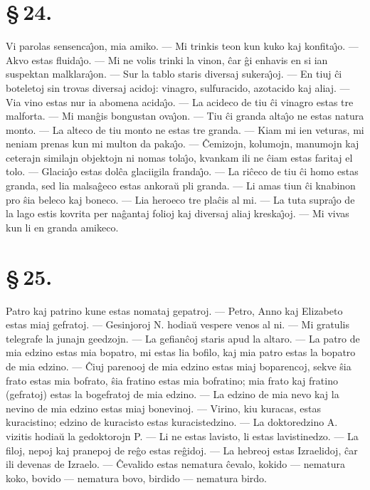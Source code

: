 \section*{\S\,24.}
Vi parolas sensenca\^{\j}on, mia amiko. --- Mi trinkis teon kun kuko
kaj konfita\^{\j}o. --- Akvo estas fluida\^{\j}o. --- Mi ne volis
trinki la vinon, \^car \^gi enhavis en si ian suspektan
malklara\^{\j}on. --- Sur la tablo staris diversaj sukera\^{\j}oj.
--- En tiuj \^ci boteletoj sin trovas diversaj acidoj: vinagro,
sulfuracido, azotacido kaj aliaj. --- Via vino estas nur ia abomena
acida\^{\j}o. --- La acideco de tiu \^ci vinagro estas tre malforta.
--- Mi man\^gis bongustan ova\^{\j}on. --- Tiu \^ci granda alta\^{\j}o
ne estas natura monto. --- La alteco de tiu monto ne estas tre
granda. --- Kiam mi ien veturas, mi neniam prenas kun mi multon da
paka\^{\j}o. --- \^Cemizojn, kolumojn, manumojn kaj ceterajn
similajn objektojn ni nomas tola\^{\j}o, kvankam ili ne \^ciam estas
faritaj el tolo. --- Glacia\^{\j}o estas dol\^ca glaciigila
franda\^{\j}o. --- La ri\^ceco de tiu \^ci homo estas granda, sed
lia malsa\^geco estas ankora\u u pli granda. --- Li amas tiun \^ci
knabinon pro \^sia beleco kaj boneco. --- Lia heroeco tre pla\^cis
al mi. --- La tuta supra\^{\j}o de la lago estis kovrita per
na\^gantaj folioj kaj diversaj aliaj kreska\^{\j}oj. --- Mi vivas
kun li en granda amikeco.


\section*{\S\,25.}
Patro kaj patrino kune estas nomataj gepatroj. --- Petro, Anno kaj
Elizabeto estas miaj gefratoj. --- Gesinjoroj N. hodia\u u vespere
venos al ni. --- Mi gratulis telegrafe la junajn geedzojn. --- La
gefian\^coj staris apud la altaro. --- La patro de mia edzino estas
mia bopatro, mi estas lia bofilo, kaj mia patro estas la bopatro de
mia edzino. --- \^Ciuj parenooj de mia edzino estas miaj boparencoj,
sekve \^sia frato estas mia bofrato, \^sia fratino estas mia
bofratino; mia frato kaj fratino (gefratoj) estas la bogefratoj de
mia edzino. --- La edzino de mia nevo kaj la nevino de mia edzino
estas miaj bonevinoj. --- Virino, kiu kuracas, estas kuracistino;
edzino de kuracisto estas kuracistedzino. --- La doktoredzino A.
vizitis hodia\u u la gedoktorojn P. --- Li ne estas lavisto, li
estas lavistinedzo. --- La filoj, nepoj kaj pranepoj de re\^go estas
re\^gidoj. --- La hebreoj estas Izraelidoj, \^car ili devenas de
Izraelo. --- \^Cevalido estas nematura \^cevalo, kokido --- nematura
koko, bovido --- nematura bovo, birdido --- nematura birdo.


